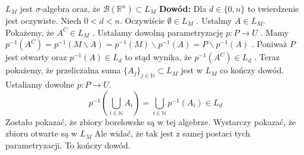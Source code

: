 \begin{tw}
    $L_M$ jest $\sigma$-algebra oraz, że $\mathcal{B}(\mathbb{R}^n) \subset L_M$ 
    \newline
    \textbf{Dowód:}\newline
    Dla $d \in \{0, n\}$ to twierdzenie jest oczywiste. Niech $0 < d < n$. Oczywiście $\emptyset \in L_M$ . Ustalmy $A \in L_M$. 
    Pokażemy, że $A^C \in L_M$ . Ustalamy dowolną parametryzację $p: P \rightarrow U$ . Mamy $p^{-1}(A^C) = p^{-1}(M \backslash A) = p^{-1}(M) \backslash p^{-1}(A) = P \backslash p^{-1}(A)$ . Poniważ $P$ jest otwarty oraz $p^{-1}(A) \in L_d$ to stąd wynika, że $p^{-1}(A^C) \in L_d$ .
    Teraz pokażemy, że przeliczalna suma $\{A_j\}_{j \in \mathbb{N}} \subset L_M$ jest w $L_M$ co kończy dowód. Ustaliamy dowolne $p: P \rightarrow U$. $$ 
    p^{-1}(\bigcup_{i \in \mathbb{N}} A_i ) = \bigcup_{i \in \mathbb{N}} p^{-1}(A_i) \in L_d
    $$ Zostało pokazać, że zbiory borelowske są w tej algebrze. Wystarczy pokazać, że zbioru otwarte są w $L_M$ Ale widać, że tak jest z samej postaci tych parametryzacji. To kończy dowód.  
\end{tw}